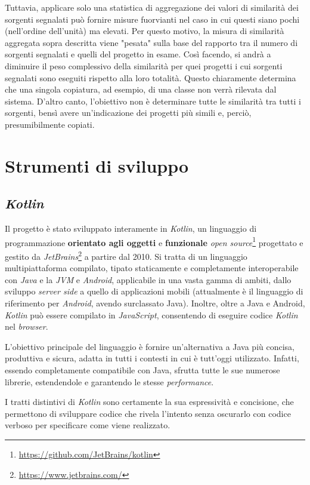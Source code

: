 Tuttavia, applicare solo una statistica di aggregazione dei valori di similarità dei sorgenti segnalati può fornire misure fuorvianti nel caso in cui questi siano pochi (nell'ordine dell'unità) ma elevati.
%
Per questo motivo, la misura di similarità aggregata sopra descritta viene "pesata" sulla base del rapporto tra il numero di sorgenti segnalati e quelli del progetto in esame.
%
Così facendo, si andrà a diminuire il peso complessivo della similarità per quei progetti i cui sorgenti segnalati sono eseguiti rispetto alla loro totalità.
%
Questo chiaramente determina che una singola copiatura, ad esempio, di una classe non verrà rilevata dal sistema.
%
D'altro canto, l'obiettivo non è determinare tutte le similarità tra tutti i sorgenti, bensì avere un'indicazione dei progetti più simili e, perciò, presumibilmente copiati.

\newpage
\section{Strumenti di sviluppo}

\subsection*{\textit{Kotlin}}
Il progetto è stato sviluppato interamente in \textit{Kotlin}, un linguaggio di programmazione \textbf{orientato agli oggetti} e \textbf{funzionale} \textit{open source}\footnote{\url{https://github.com/JetBrains/kotlin}} progettato e gestito da \textit{JetBrains}\footnote{\url{https://www.jetbrains.com/}} a partire dal 2010.
%
Si tratta di un linguaggio multipiattaforma compilato, tipato staticamente e  completamente interoperabile con \textit{Java} e la \textit{JVM} e \textit{Android}, applicabile in una vasta gamma di ambiti, dallo sviluppo \textit{server side} a quello di applicazioni mobili (attualmente è il linguaggio di riferimento per \textit{Android}, avendo surclassato Java).
%
Inoltre, oltre a Java e Android, \textit{Kotlin} può essere compilato in \textit{JavaScript}, consentendo di eseguire codice \textit{Kotlin} nel \textit{browser}.

L'obiettivo principale del linguaggio è fornire un'alternativa a Java più concisa, produttiva e sicura, adatta in tutti i contesti in cui è tutt'oggi utilizzato.
%
Infatti, essendo completamente compatibile con Java, sfrutta tutte le sue numerose librerie, estendendole e garantendo le stesse \textit{performance}.

I tratti distintivi di \textit{Kotlin} sono certamente la sua espressività e concisione, che permettono di sviluppare codice che rivela l'intento senza oscurarlo con codice verboso per specificare come viene realizzato.

